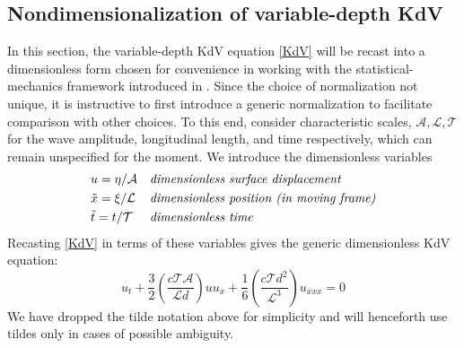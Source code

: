 \documentclass[11pt]{article}
\newcommand{\depth}{d}
\newcommand{\ampscale}{\mathcal{A}}
\newcommand{\lengthscale}{\mathcal{L}}
\newcommand{\timescale}{\mathcal{T}}
\begin{document}
 
\subsection{Nondimensionalization of variable-depth KdV}

In this section, the variable-depth KdV equation \eqref{KdV} will be recast into a dimensionless form chosen for convenience in working with the statistical-mechanics framework introduced in \cite{majda2019statistical}. Since the choice of normalization not unique, it is instructive to first introduce a generic normalization to facilitate comparison with other choices. To this end, consider characteristic scales, $\ampscale, \lengthscale, \timescale$ for the wave amplitude, longitudinal length, and time respectively, which can remain unspecified for the moment. We introduce the dimensionless variables
\begin{align}
&u = \eta / \ampscale
&&\mbox{\em dimensionless surface displacement} \\
&\tilde{x} = \xi / \lengthscale
&&\mbox{\em dimensionless position (in moving frame)} \\
&\tilde{t} = t / \timescale
&&\mbox{\em dimensionless time}
\end{align}
Recasting \eqref{KdV} in terms of these variables gives the generic dimensionless KdV equation:
\begin{equation}
u_t + \frac{3}{2} \left( \frac{c \timescale \ampscale}{\lengthscale \depth} \right) u u_x 
+ \frac{1}{6} \left( \frac{c \timescale \depth^2}{\lengthscale^3} \right) u_{xxx} = 0
\end{equation}
We have dropped the tilde notation above for simplicity and will henceforth use tildes only in cases of possible ambiguity.
\end{document}
